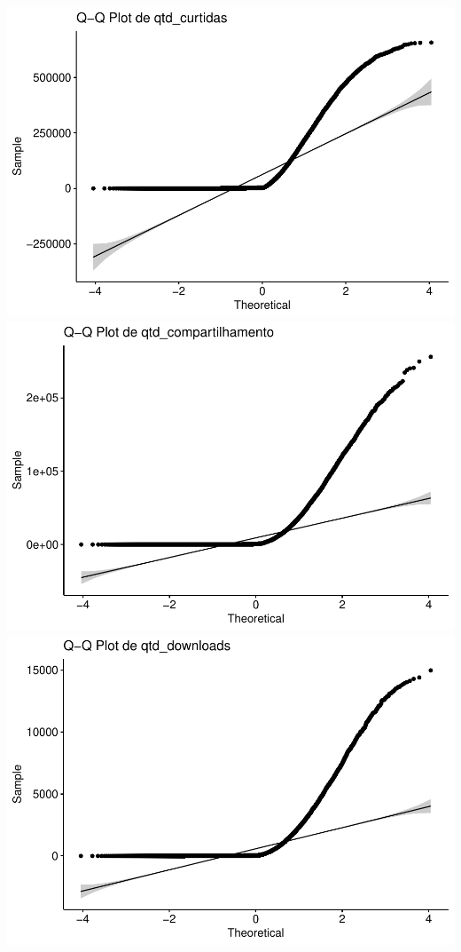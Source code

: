 \documentclass[
]{article}
\begin{document}
\includegraphics{dados_videos_files/figure-latex/qqplot_variaveis-3.pdf}
\includegraphics{dados_videos_files/figure-latex/qqplot_variaveis-4.pdf}
\includegraphics{dados_videos_files/figure-latex/qqplot_variaveis-5.pdf}
\end{document}
